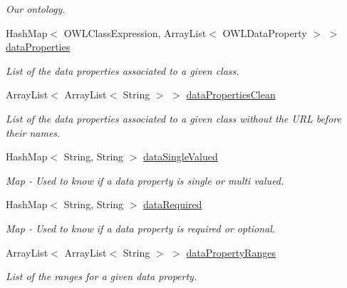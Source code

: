 \begin{DoxyCompactItemize}
\begin{DoxyCompactList}\small\item\em Our ontology. \end{DoxyCompactList}\item 
HashMap$<$ OWLClassExpression, ArrayList$<$ OWLDataProperty $>$ $>$ \hyperlink{class_ontology_1_1_data_property_af2428254ca584e305288b51f6645e250}{dataProperties}
\begin{DoxyCompactList}\small\item\em List of the data properties associated to a given class. \end{DoxyCompactList}\item 
ArrayList$<$ ArrayList$<$ String $>$ $>$ \hyperlink{class_ontology_1_1_data_property_a016e25b09967876b7191033daab24d2c}{dataPropertiesClean}
\begin{DoxyCompactList}\small\item\em List of the data properties associated to a given class without the URL before their names. \end{DoxyCompactList}\item 
HashMap$<$ String, String $>$ \hyperlink{class_ontology_1_1_data_property_a2de9cc72a21e027da8208f9a2df0bd56}{dataSingleValued}
\begin{DoxyCompactList}\small\item\em Map -\/ Used to know if a data property is single or multi valued. \end{DoxyCompactList}\item 
HashMap$<$ String, String $>$ \hyperlink{class_ontology_1_1_data_property_aa8750eab83c0207b3acc8b87581e84c7}{dataRequired}
\begin{DoxyCompactList}\small\item\em Map -\/ Used to know if a data property is required or optional. \end{DoxyCompactList}\item 
ArrayList$<$ ArrayList$<$ String $>$ $>$ \hyperlink{class_ontology_1_1_data_property_a9ffdd8ee11bc8c9a2651e512da2485b7}{dataPropertyRanges}
\begin{DoxyCompactList}\small\item\em List of the ranges for a given data property. \end{DoxyCompactList}\end{DoxyCompactItemize}
